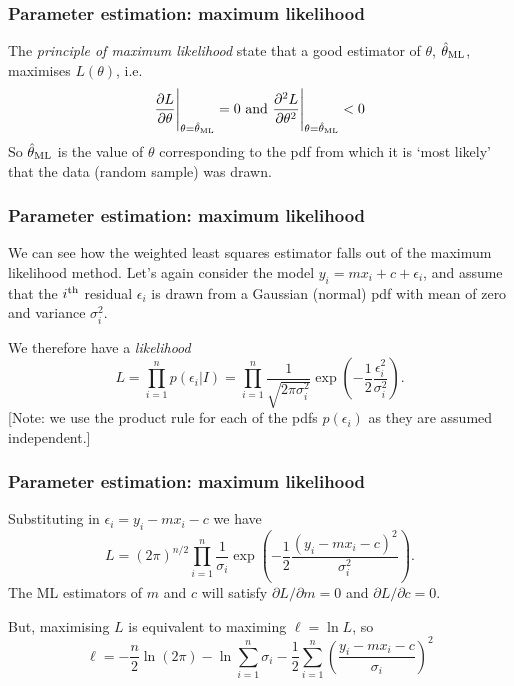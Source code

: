 \begin{frame}

\frametitle{Parameter estimation: maximum likelihood}
\label{parameterestimation:maximumlikelihood}

The \emph{principle of maximum likelihood} state that a good estimator of $\theta$, $\hat{\theta}_{\rm ML}$,
maximises $L(\theta)$, i.e.
\[
\frac{\partial L}{\partial \theta}\Bigg|_{\theta = \hat{\theta}_{\rm ML}} = 0 \text{~and~} \frac{\partial^2 L}{\partial \theta^2}\Bigg|_{\theta = \hat{\theta}_{\rm ML}} < 0
\]
So $\hat{\theta}_{\rm ML}$ is the value of $\theta$ corresponding to the pdf from which it is `most likely'
that the data (random sample) was drawn.

\end{frame}

\begin{frame}

\frametitle{Parameter estimation: maximum likelihood}
\label{parameterestimation:maximumlikelihood}

We can see how the weighted least squares estimator falls out of the maximum likelihood method. Let's
again consider the model $y_i = mx_i + c + \epsilon_i$, and assume that the $i^{\rm th}$ residual $\epsilon_i$
is drawn from a Gaussian (normal) pdf with mean of zero and variance $\sigma_i^2$.

We therefore have a \emph{likelihood}
\[
L = \prod_{i=1}^n p(\epsilon_i|I) = \prod_{i=1}^n\frac{1}{\sqrt{2\pi\sigma_i^2}}\exp{\left(-\frac{1}{2}\frac{\epsilon_i^2}{\sigma_i^2}\right)}.
\]
[Note: we use the product rule for each of the pdfs $p(\epsilon_i)$ as they are assumed independent.]

\end{frame}

\begin{frame}

\frametitle{Parameter estimation: maximum likelihood}
\label{parameterestimation:maximumlikelihood}

Substituting in $\epsilon_i = y_i - mx_i - c$ we have
\[
L = (2\pi)^{n/2} \prod_{i=1}^n\frac{1}{\sigma_i}\exp{\left(-\frac{1}{2}\frac{(y_i-mx_i-c)^2}{\sigma_i^2}\right)}.
\]
The ML estimators of $m$ and $c$ will satisfy $\partial L/\partial m = 0$ and $\partial L/\partial c = 0$.

But, maximising $L$ is equivalent to maximing $\ell = \ln{L}$, so
\[
\ell = -\frac{n}{2}\ln{(2\pi)} - \ln{\sum_{i=1}^n \sigma_i} - \frac{1}{2} \sum_{i=1}^n \left( \frac{y_i - mx_i - c}{\sigma_i} \right)^2
\]

\end{frame}

